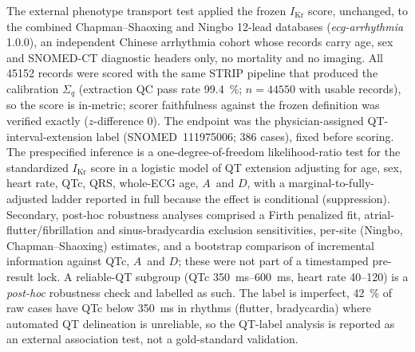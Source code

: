 \documentclass[11pt]{article}
\newcommand{\D}{\ensuremath{D}}
\newcommand{\A}{\ensuremath{A}}
\begin{document}
The external phenotype transport test applied the frozen $I_{\text{Kr}}$ score, unchanged, to
the combined Chapman--Shaoxing and Ningbo 12-lead databases (\emph{ecg-arrhythmia} 1.0.0), an
independent Chinese arrhythmia cohort whose records carry age, sex and SNOMED-CT diagnostic
headers only, no mortality and no imaging. All \num{45152} records were scored with the same
STRIP pipeline that produced the calibration $\Sigma_q$ (extraction QC pass rate \SI{99.4}{\percent};
$n=\num{44550}$ with usable records), so the score is in-metric; scorer faithfulness against the
frozen definition was verified exactly ($z$-difference \num{0}). The endpoint was the
physician-assigned QT-interval-extension label (SNOMED~111975006; \num{386} cases), fixed before
scoring. The prespecified inference is a one-degree-of-freedom likelihood-ratio test for the
standardized $I_{\text{Kr}}$ score in a logistic model of QT extension adjusting for age, sex,
heart rate, QTc, QRS, whole-ECG age, \A\ and \D, with a marginal-to-fully-adjusted ladder reported
in full because the effect is conditional (suppression). Secondary, post-hoc robustness analyses comprised a Firth
penalized fit, atrial-flutter/fibrillation and sinus-bradycardia exclusion sensitivities,
per-site (Ningbo, Chapman--Shaoxing) estimates, and a bootstrap comparison of incremental
information against QTc, \A\ and \D; these were not part of a timestamped pre-result lock. A reliable-QT subgroup (QTc \SIrange{350}{600}{\milli\second},
heart rate \SIrange{40}{120}{}) is a \emph{post-hoc} robustness check and labelled as
such. The label is imperfect, \SI{42}{\percent} of raw cases have QTc below \SI{350}{\milli\second}
in rhythms (flutter, bradycardia) where automated QT delineation is unreliable, so the QT-label
analysis is reported as an external association test, not a gold-standard validation.
\end{document}
